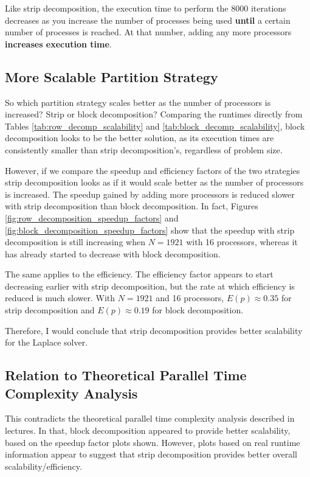 \documentclass{article}
\begin{document}
Like strip decomposition, the execution time to perform the 8000 iterations decreases as you increase the number of processes being used \textbf{until} a certain number of processes is reached. At that number, adding any more processors \textbf{increases execution time}.

\subsection{More Scalable Partition Strategy}

So which partition strategy scales better as the number of processors is increased? Strip or block decomposition? Comparing the runtimes directly from Tables \ref{tab:row_decomp_scalability} and  \ref{tab:block_decomp_scalability}, block decomposition looks to be the better solution, as its execution times are consistently smaller than strip decomposition's, regardless of problem size.

However, if we compare the speedup and efficiency factors of the two strategies strip decomposition looks as if it would scale better as the number of processors is increased. The speedup gained by adding more processors is reduced slower with strip decomposition than block decomposition. In fact, Figures \ref{fig:row_decomposition_speedup_factors} and \ref{fig:block_decomposition_speedup_factors} show that the speedup with strip decomposition is still increasing when $N = 1921$ with 16 processors, whereas it has already started to decrease with block decomposition.

The same applies to the efficiency. The efficiency factor appears to start decreasing earlier with strip decomposition, but the rate at which efficiency is reduced is much slower. With $N = 1921$ and 16 processors, $E(p) \approx 0.35$ for strip decomposition and $E(p) \approx 0.19$ for block decomposition. 

Therefore, I would conclude that strip decomposition provides better scalability for the Laplace solver.

\subsection{Relation to Theoretical Parallel Time Complexity Analysis}

This contradicts the theoretical parallel time complexity analysis described in lectures. In that, block decomposition appeared to provide better scalability, based on the speedup factor plots shown. However, plots based on real runtime information appear to suggest that strip decomposition provides better overall scalability/efficiency.
\end{document}
